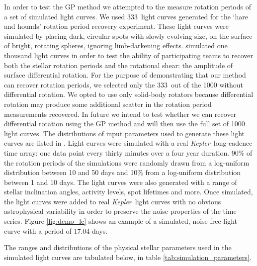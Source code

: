 \documentclass[useAMS, usenatbib, preprint, 12pt]{aastex}
\newcommand{\nlightcurves}{333}
\newcommand{\Kepler}{{\it Kepler}}
\newcommand{\kepler}{\Kepler}
\begin{document}
In order to test the GP method we attempted to the measure rotation periods of
a set of simulated light curves.
We used \nlightcurves\ light curves generated for the \citet{Aigrain2015}
`hare and hounds' rotation period recovery experiment.
These light curves were simulated by placing dark, circular spots with slowly
evolving size, on the surface of bright, rotating spheres, ignoring
limb-darkening effects.
\citet{Aigrain2015} simulated one thousand light curves in order to test the
ability of participating teams to recover both the stellar rotation periods
and the rotational shear: the amplitude of surface differential rotation.
For the purpose of demonstrating that our method can recover rotation periods,
we selected only the \nlightcurves\ out of the 1000 without differential
rotation.
We opted to use only solid-body rotators because differential rotation may
produce some additional scatter in the rotation period measurements recovered.
In future we intend to test whether we can recover differential rotation using
the GP method and will then use the full set of 1000 light curves.
The distributions of input parameters used to generate these light curves are
listed in \citet{Aigrain2015}.
Light curves were simulated with a real \Kepler\ long-cadence time array:
one data point every thirty minutes over a four year duration.
90\% of the rotation periods of the simulations were randomly drawn from a
log-uniform distribution between 10 and 50 days and 10\% from a log-uniform
distribution between 1 and 10 days.
The light curves were also generated with a range of stellar inclination
angles, activity levels, spot lifetimes and more.
Once simulated, the light curves were added to real \kepler\ light curves with
no obvious astrophysical variability in order to preserve the noise properties
of the time series.
Figure \ref{fig:demo_lc} shows an example of a simulated, noise-free
light curve with a period of 17.04 days.

The ranges and distributions of the physical stellar parameters used in the
simulated light curves are tabulated below, in table
\ref{tab:simulation_parameters}.
\end{document}
